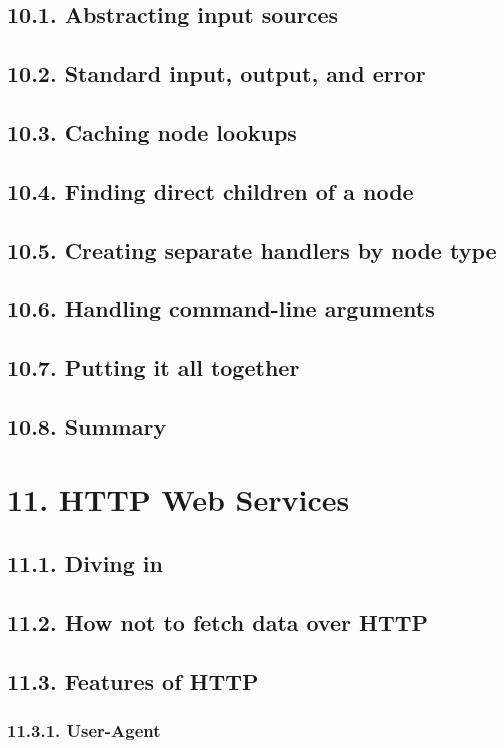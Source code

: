 \documentclass[oneside,12pt]{book}
\begin{document}
\section{10.1. Abstracting input sources}
\section{10.2. Standard input, output, and error}
\section{10.3. Caching node lookups}
\section{10.4. Finding direct children of a node}
\section{10.5. Creating separate handlers by node type}
\section{10.6. Handling command-line arguments}
\section{10.7. Putting it all together}
\section{10.8. Summary}
   
\chapter{11. HTTP Web Services}
\section{11.1. Diving in}
\section{11.2. How not to fetch data over HTTP}
\section{11.3. Features of HTTP}
\subsection{11.3.1. User-Agent}
\end{document}
